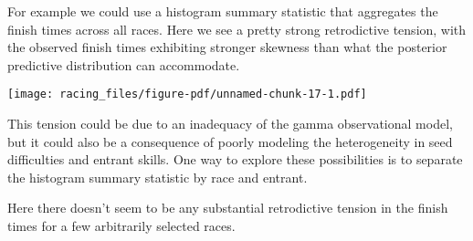 \documentclass[
  letterpaper,
  DIV=11,
  numbers=noendperiod]{scrartcl}
\newenvironment{Shaded}{\begin{snugshade}}{\end{snugshade}}
\newcommand{\AttributeTok}[1]{\textcolor[rgb]{0.40,0.45,0.13}{#1}}
\newcommand{\DecValTok}[1]{\textcolor[rgb]{0.68,0.00,0.00}{#1}}
\newcommand{\FunctionTok}[1]{\textcolor[rgb]{0.28,0.35,0.67}{#1}}
\newcommand{\NormalTok}[1]{\textcolor[rgb]{0.00,0.23,0.31}{#1}}
\newcommand{\SpecialCharTok}[1]{\textcolor[rgb]{0.37,0.37,0.37}{#1}}
\newcommand{\StringTok}[1]{\textcolor[rgb]{0.13,0.47,0.30}{#1}}
\begin{document}
For example we could use a histogram summary statistic that aggregates
the finish times across all races. Here we see a pretty strong
retrodictive tension, with the observed finish times exhibiting stronger
skewness than what the posterior predictive distribution can
accommodate.

\begin{Shaded}
\end{Shaded}

\texttt{[image: racing\_files/figure-pdf/unnamed-chunk-17-1.pdf]}

This tension could be due to an inadequacy of the gamma observational
model, but it could also be a consequence of poorly modeling the
heterogeneity in seed difficulties and entrant skills. One way to
explore these possibilities is to separate the histogram summary
statistic by race and entrant.

Here there doesn't seem to be any substantial retrodictive tension in
the finish times for a few arbitrarily selected races.
\end{document}
